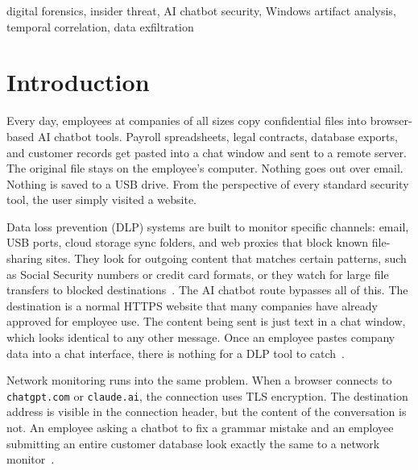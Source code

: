 \documentclass[conference]{IEEEtran}
\begin{document}
\begin{IEEEkeywords}
digital forensics, insider threat, AI chatbot security, Windows artifact
analysis, temporal correlation, data exfiltration
\end{IEEEkeywords}


\section{Introduction}
\label{sec:intro}

Every day, employees at companies of all sizes copy confidential files
into browser-based AI chatbot tools. Payroll spreadsheets, legal
contracts, database exports, and customer records get pasted into a
chat window and sent to a remote server. The original file stays on the
employee's computer. Nothing goes out over email. Nothing is saved to a
USB drive. From the perspective of every standard security tool, the
user simply visited a website.

Data loss prevention (DLP) systems are built to monitor specific
channels: email, USB ports, cloud storage sync folders, and web proxies
that block known file-sharing sites. They look for outgoing content that
matches certain patterns, such as Social Security numbers or credit card
formats, or they watch for large file transfers to blocked
destinations~\cite{diro2025workplace}. The AI chatbot route bypasses all
of this. The destination is a normal HTTPS website that many companies
have already approved for employee use. The content being sent is just
text in a chat window, which looks identical to any other message. Once
an employee pastes company data into a chat interface, there is nothing
for a DLP tool to catch~\cite{gupta2023threatgpt}.

Network monitoring runs into the same problem. When a browser connects
to \texttt{chatgpt.com} or \texttt{claude.ai}, the connection uses TLS
encryption. The destination address is visible in the connection header,
but the content of the conversation is not. An employee asking a chatbot
to fix a grammar mistake and an employee submitting an entire customer
database look exactly the same to a network monitor~\cite{zhou2024tls}.
\end{document}
